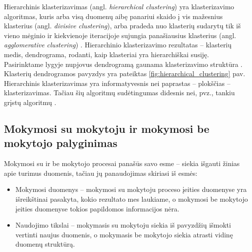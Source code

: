 Hierarchinis klasterizavimas (angl. \textit{hierarchical clustering}) yra klasterizavimo algoritmas, kuris arba visą duomenų aibę panariui skaido į vis mažesnius klasterius (angl. \textit{divisive clustering}), arba pradeda nuo klasterių sudarytų tik iš vieno mėginio ir kiekvienoje iteracijoje sujungia panašiausius klasterius (angl. \textit{agglomerative clustering}) \cite{DBLP:books/mk/HanK2000}.  Hierarchinio klasterizavimo rezultatas -- klasterių medis, dendrograma, rodanti, kaip klasteriai yra hierarchiškai susiję. Pasirinktame lygyje nupjovus dendrogramą gaunama klasterizavimo struktūra \cite{martisiute08}. Klasterių dendrogramos pavyzdys yra pateiktas \ref{fig:hierarchical_clustering} pav. Hierarchinis klasterizavimas yra informatyvesnis nei paprastas -- plokščias -- klasterizavimas. Tačiau šių algoritmų sudėtingumas didesnis nei, pvz., tankiu grįstų algoritmų \cite{DBLP:books/mk/HanK2000}.

\subsection{Mokymosi su mokytoju ir mokymosi be mokytojo palyginimas}

 Mokymosi su ir be mokytojo procesai panašūs savo esme -- siekia išgauti žinias apie turimus duomenis, tačiau jų panaudojimas skiriasi iš esmės:
\begin{itemize}
  \item Mokymosi duomenys -- mokymosi su mokytoju proceso įeities duomenyse yra išreikštinai pasakyta, kokio rezultato mes laukiame, o mokymosi be mokytojo įeities duomenyse tokios papildomos informacijos nėra.
  \item  Naudojimo tikslai -- mokymasis su mokytoju siekia iš pavyzdžių išmokti vertinti naujus duomenis, o mokymasis be mokytojo siekia atrasti vidinę duomenų struktūrą.
\end{itemize}



